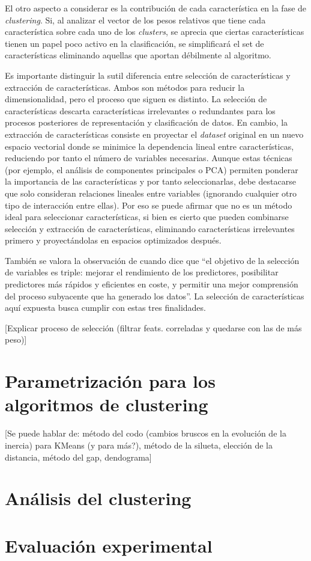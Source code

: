 El otro aspecto a considerar es la contribución de cada característica en la fase de \emph{clustering}.
Si, al analizar el vector de los pesos relativos que tiene cada característica sobre cada uno de los \emph{clusters},
se aprecia que ciertas características tienen un papel poco activo en la clasificación,
se simplificará el set de características eliminando aquellas que aportan débilmente al algoritmo.

Es importante distinguir la sutil diferencia entre selección de características y extracción de características.
Ambos son métodos para reducir la dimensionalidad, pero el proceso que siguen es distinto.
La selección de características descarta características irrelevantes o redundantes para los procesos posteriores de representación y clasificación de datos.
En cambio, la extracción de características consiste en proyectar el \emph{dataset} original en un nuevo espacio vectorial
donde se minimice la dependencia lineal entre características, reduciendo por tanto el número de variables necesarias.
Aunque estas técnicas (por ejemplo, el análisis de componentes principales o PCA) permiten ponderar la importancia de las características y por tanto seleccionarlas,
debe destacarse que solo consideran relaciones lineales entre variables (ignorando cualquier otro tipo de interacción entre ellas).
Por eso se puede afirmar que no es un método ideal para seleccionar características, si bien es cierto
que pueden combinarse selección y extracción de características, eliminando características irrelevantes primero y proyectándolas en espacios optimizados después.

También se valora la observación de \cite{Guyon_2003} cuando dice que ``el objetivo de la selección de variables es triple: mejorar el rendimiento de los predictores, posibilitar predictores más rápidos y eficientes en coste, y permitir una mejor comprensión del proceso subyacente que ha generado los datos''.
La selección de características aquí expuesta busca cumplir con estas tres finalidades.

[Explicar proceso de selección (filtrar feats. correladas y quedarse con las de más peso)]

\section{Parametrización para los algoritmos de clustering}\label{sec:parametrizacion}
[Se puede hablar de: método del codo (cambios bruscos en la evolución de la inercia) para KMeans (y para más?),
                     método de la silueta, elección de la distancia, método del gap, dendograma]

\section{Análisis del clustering}\label{sec:analisisdelclustering}

\section{Evaluación experimental}\label{sec:evaluacionexperimental}
